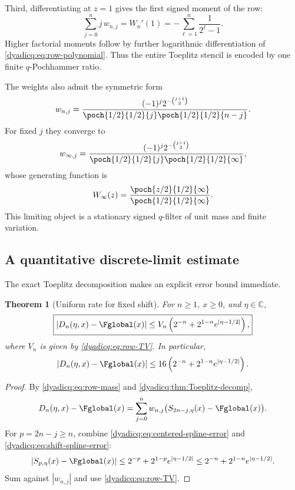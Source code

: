 \documentclass[11pt,oneside]{article}
\newtheorem{theorem}{Theorem}[section]
\theoremstyle{definition}
\theoremstyle{remark}
\newcommand{\C}{\mathbb C}
\begin{document}
Third, differentiating at $z=1$ gives the first signed moment of the row:
\begin{equation}\label{dyadicq:eq:row-first-moment}
 \sum_{j=0}^{n}j\,w_{n,j}
 =W_n'(1)
 =-\sum_{\ell=1}^{n}\frac1{2^\ell-1}.
\end{equation}
Higher factorial moments follow by further logarithmic differentiation of
\eqref{dyadicq:eq:row-polynomial}.  Thus the entire Toeplitz stencil is encoded by one
finite $q$-Pochhammer ratio.

The weights also admit the symmetric form
\begin{equation}\label{dyadicq:eq:weights-symmetric}
 w_{n,j}=
 \frac{(-1)^j2^{-\binom{j+1}{2}}}
 {\poch{1/2}{1/2}{j}\poch{1/2}{1/2}{n-j}}.
\end{equation}
For fixed $j$ they converge to
\begin{equation}\label{dyadicq:eq:limit-weights}
 w_{\infty,j}=
 \frac{(-1)^j2^{-\binom{j+1}{2}}}
 {\poch{1/2}{1/2}{j}\poch{1/2}{1/2}{\infty}},
\end{equation}
whose generating function is
\begin{equation}\label{dyadicq:eq:limit-filter}
 W_\infty(z)=
 \frac{\poch{z/2}{1/2}{\infty}}
 {\poch{1/2}{1/2}{\infty}}.
\end{equation}
This limiting object is a stationary signed $q$-filter of unit mass and finite
variation.

\subsection{A quantitative discrete-limit estimate}

The exact Toeplitz decomposition makes an explicit error bound immediate.

\begin{theorem}[Uniform rate for fixed shift]\label{dyadicq:thm:Dn-rate}
For $n\ge1$, $x\ge0$, and $\eta\in\C$,
\begin{equation}\label{dyadicq:eq:Dn-rate}
 \boxed{
 |D_n(\eta,x)-\Fglobal(x)|
 \le V_n\left(2^{-n}+2^{1-n}e^{|\eta-1/2|}\right),}
\end{equation}
where $V_n$ is given by \eqref{dyadicq:eq:row-TV}.  In particular,
\begin{equation}\label{dyadicq:eq:Dn-rate-16}
 |D_n(\eta,x)-\Fglobal(x)|
 \le16\left(2^{-n}+2^{1-n}e^{|\eta-1/2|}\right).
\end{equation}
\end{theorem}

\begin{proof}
By \eqref{dyadicq:eq:row-mass} and \cref{dyadicq:thm:Toeplitz-decomp},
\[
 D_n(\eta,x)-\Fglobal(x)
 =\sum_{j=0}^{n}w_{n,j}
  \bigl(S_{2n-j,\eta}(x)-\Fglobal(x)\bigr).
\]
For $p=2n-j\ge n$, combine
\eqref{dyadicq:eq:centered-spline-error} and \eqref{dyadicq:eq:shift-spline-error}:
\[
 |S_{p,\eta}(x)-\Fglobal(x)|
 \le2^{-p}+2^{1-p}e^{|\eta-1/2|}
 \le2^{-n}+2^{1-n}e^{|\eta-1/2|}.
\]
Sum against $|w_{n,j}|$ and use \eqref{dyadicq:eq:row-TV}.
\end{proof}
\end{document}
